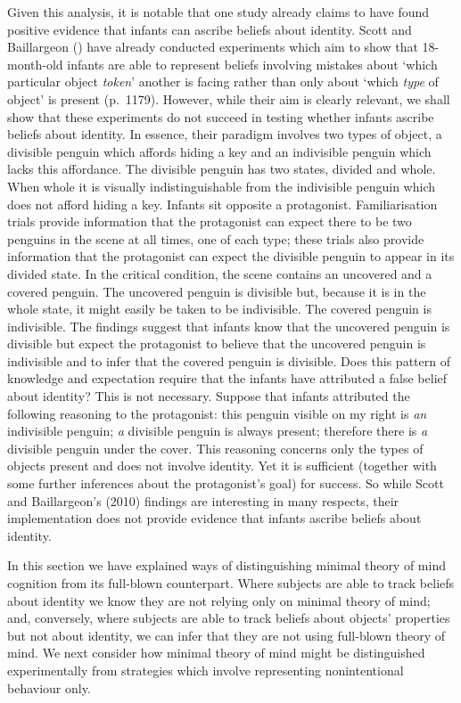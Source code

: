 \documentclass[12pt,\papersize]{extarticle}
\begin{document}
Given this analysis, it is notable that one study already claims to have found positive evidence that infants can ascribe beliefs about identity. 
Scott and Baillargeon (\citeyear{en_1690}) have already conducted experiments which aim to show that 18-month-old infants are able to represent beliefs involving mistakes about `which particular object \textit{token}' another is facing rather than only about `which \textit{type} of object' is present (p.\ 1179). However, while their aim is clearly relevant, we shall show that these experiments do not succeed in testing whether infants ascribe beliefs about identity.  In essence, their paradigm involves two types of object, a divisible penguin which affords hiding a key and an indivisible penguin which lacks this affordance.  The divisible penguin has two states, divided and whole.  When whole it is visually indistinguishable from the indivisible penguin which does not afford hiding a key.  Infants sit opposite a protagonist.  Familiarisation trials provide information that the protagonist can expect there to be two penguins in the scene at all times, one of each type; these trials also provide information that the protagonist can expect the divisible penguin to appear in its divided state. In the critical condition, the scene contains an uncovered and a covered penguin. The uncovered penguin is divisible but, because it is in the whole state, it might easily be taken to be indivisible.  The covered penguin is indivisible.  The findings suggest that infants know that the uncovered penguin is divisible but expect the protagonist to believe that the uncovered penguin is indivisible and to infer that the covered penguin is divisible.  Does this pattern of knowledge and expectation require that the infants have attributed a false belief about identity?  This is not necessary. Suppose that infants attributed the following reasoning to the protagonist: this penguin visible on my right is \textit{an} indivisible penguin; \textit{a} divisible penguin is always present; therefore there is \textit{a} divisible penguin under the cover.  This reasoning concerns only the types of objects present and does not involve identity. Yet it is sufficient (together with some further inferences about the protagonist’s goal) for success. So while Scott and Baillargeon’s (2010) findings are interesting in many respects, their implementation does not provide evidence that infants ascribe beliefs about identity.

In this section we have explained ways of distinguishing minimal theory of mind cognition from its full-blown counterpart.  Where subjects are able to track beliefs about identity we know they are not relying only on minimal theory of mind; and, conversely, where subjects are able to track beliefs about objects’ properties but not about identity, we can infer that they are not using full-blown theory of mind.  We next consider how  minimal theory of mind might be distinguished experimentally from strategies which involve representing nonintentional behaviour only.
	
\end{document}

